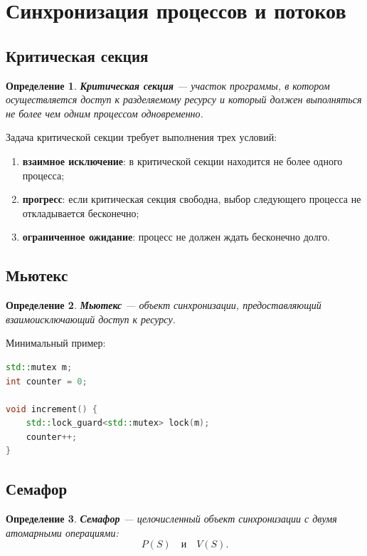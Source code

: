 \documentclass[12pt,a4paper]{article}
\newtheorem{definition}{Определение}
\begin{document}
\section{Синхронизация процессов и потоков}

\subsection{Критическая секция}

\begin{definition}
\textbf{Критическая секция} --- участок программы, в котором осуществляется доступ к разделяемому ресурсу и который должен выполняться не более чем одним процессом одновременно.
\end{definition}

Задача критической секции требует выполнения трех условий:
\begin{enumerate}
    \item \textbf{взаимное исключение}: в критической секции находится не более одного процесса;
    \item \textbf{прогресс}: если критическая секция свободна, выбор следующего процесса не откладывается бесконечно;
    \item \textbf{ограниченное ожидание}: процесс не должен ждать бесконечно долго.
\end{enumerate}

\subsection{Мьютекс}

\begin{definition}
\textbf{Мьютекс} --- объект синхронизации, предоставляющий взаимоисключающий доступ к ресурсу.
\end{definition}

Минимальный пример:

\begin{lstlisting}[language=C++]
std::mutex m;
int counter = 0;

void increment() {
    std::lock_guard<std::mutex> lock(m);
    counter++;
}
\end{lstlisting}

\subsection{Семафор}

\begin{definition}
\textbf{Семафор} --- целочисленный объект синхронизации с двумя атомарными операциями:
\[
P(S) \quad \text{и} \quad V(S).
\]
\end{definition}
\end{document}
